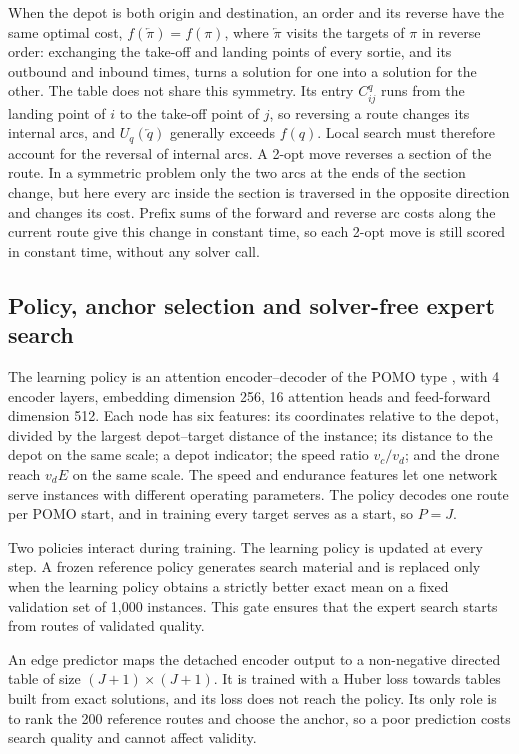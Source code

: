 \documentclass[preprint,12pt,authoryear]{elsarticle}
\begin{document}
When the depot is both origin and destination, an order and its reverse have the same optimal cost, $f(\overleftarrow{\pi}) = f(\pi)$, where $\overleftarrow{\pi}$ visits the targets of $\pi$ in reverse order: exchanging the take-off and landing points of every sortie, and its outbound and inbound times, turns a solution for one into a solution for the other. The table does not share this symmetry. Its entry $C^{q}_{ij}$ runs from the landing point of $i$ to the take-off point of $j$, so reversing a route changes its internal arcs, and $U_{q}(\overleftarrow{q})$ generally exceeds $f(q)$. Local search must therefore account for the reversal of internal arcs. A 2-opt move reverses a section of the route. In a symmetric problem only the two arcs at the ends of the section change, but here every arc inside the section is traversed in the opposite direction and changes its cost. Prefix sums of the forward and reverse arc costs along the current route give this change in constant time, so each 2-opt move is still scored in constant time, without any solver call.

\subsection{Policy, anchor selection and solver-free expert search}
\label{sec:search}

The learning policy is an attention encoder--decoder of the POMO type \citep{kwon2020}, with 4 encoder layers, embedding dimension 256, 16 attention heads and feed-forward dimension 512. Each node has six features: its coordinates relative to the depot, divided by the largest depot--target distance of the instance; its distance to the depot on the same scale; a depot indicator; the speed ratio $v_{c}/v_{d}$; and the drone reach $v_{d}E$ on the same scale. The speed and endurance features let one network serve instances with different operating parameters. The policy decodes one route per POMO start, and in training every target serves as a start, so $P = J$.

Two policies interact during training. The learning policy is updated at every step. A frozen reference policy generates search material and is replaced only when the learning policy obtains a strictly better exact mean on a fixed validation set of 1,000 instances. This gate ensures that the expert search starts from routes of validated quality.

An edge predictor maps the detached encoder output to a non-negative directed table of size $(J+1) \times (J+1)$. It is trained with a Huber loss towards tables built from exact solutions, and its loss does not reach the policy. Its only role is to rank the 200 reference routes and choose the anchor, so a poor prediction costs search quality and cannot affect validity.
\end{document}
